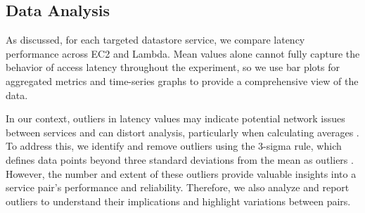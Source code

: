 \subsection{Data Analysis}
\label{sec:analysis}

As discussed, for each targeted datastore service, we compare latency performance across EC2 and Lambda. Mean values alone cannot fully capture the behavior of access latency throughout the experiment, so we use bar plots for aggregated metrics and time-series graphs to provide a comprehensive view of the data.

In our context, outliers in latency values may indicate potential network issues between services and can distort analysis, particularly when calculating averages \cite{book_bermbach_cloud_service_benchmarking}. To address this, we identify and remove outliers using the 3-sigma rule, which defines data points beyond three standard deviations from the mean as outliers \cite{}. However, the number and extent of these outliers provide valuable insights into a service pair's performance and reliability. Therefore, we also analyze and report outliers to understand their implications and highlight variations between pairs.




